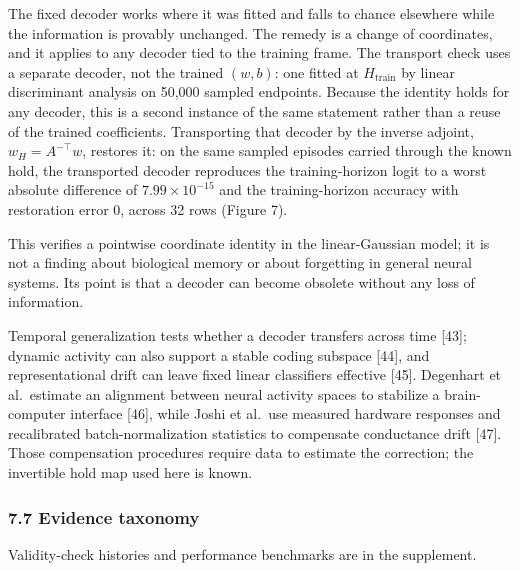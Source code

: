 \documentclass[
  10pt,
]{article}
\begin{document}
The fixed decoder works where it was fitted and falls to chance
elsewhere while the information is provably unchanged. The remedy is a
change of coordinates, and it applies to any decoder tied to the
training frame. The transport check uses a separate decoder, not the
trained \((w,b)\): one fitted at \(H_{\text{train}}\) by linear
discriminant analysis on 50,000 sampled endpoints. Because the identity
holds for any decoder, this is a second instance of the same statement
rather than a reuse of the trained coefficients. Transporting that
decoder by the inverse adjoint, \(w_H=A^{-\top}w\), restores it: on the
same sampled episodes carried through the known hold, the transported
decoder reproduces the training-horizon logit to a worst absolute
difference of \(7.99\times10^{-15}\) and the training-horizon accuracy
with restoration error \(0\), across 32 rows (Figure 7).

This verifies a pointwise coordinate identity in the linear-Gaussian
model; it is not a finding about biological memory or about forgetting
in general neural systems. Its point is that a decoder can become
obsolete without any loss of information.

Temporal generalization tests whether a decoder transfers across time
{[}43{]}; dynamic activity can also support a stable coding subspace
{[}44{]}, and representational drift can leave fixed linear classifiers
effective {[}45{]}. Degenhart et al.~estimate an alignment between
neural activity spaces to stabilize a brain-computer interface {[}46{]},
while Joshi et al.~use measured hardware responses and recalibrated
batch-normalization statistics to compensate conductance drift {[}47{]}.
Those compensation procedures require data to estimate the correction;
the invertible hold map used here is known.

\subsubsection{7.7 Evidence taxonomy}\label{evidence-taxonomy}

Validity-check histories and performance benchmarks are in the
supplement.
\end{document}
